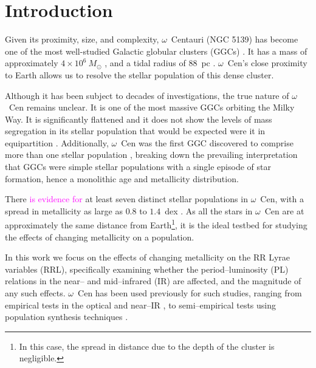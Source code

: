 \documentclass[a4paper,fleqn,usenatbib]{mnras}
\newcommand{\ocen}{$\omega$~Cen\xspace}
\begin{document}
\section{Introduction}
\label{sec:intro}

Given its proximity, size, and complexity, $\omega$~Centauri (NGC 5139) has become one of the most well-studied Galactic globular clusters (GGCs) \citep{2002ASPC..265.....V}. It has a mass of approximately $4 \times 10^6~M_{\odot}$ \citep{2013MNRAS.429.1887D}, and a tidal radius of 88~pc \citep{2005MNRAS.360..631M}. \ocen's close proximity to Earth \citep[$d \sim 5.5$~kpc, e.g.][]{2006ApJ...652..362D, 2001AJ....121.3089T} allows us to resolve the stellar population of this dense cluster. 

Although it has been subject to decades of investigations, the true nature of \ocen remains unclear. It is one of the most massive GGCs orbiting the Milky Way. It is significantly flattened \citep[$\epsilon = 1 - b/a = 0.17$][]{2005MNRAS.360..631M} and it does not show the levels of mass segregation in its stellar population that would be expected were it in equipartition \citep{2002ASPC..265...87A}. Additionally, \ocen was the first GGC discovered to comprise more than one stellar population \citep{1999Natur.402...55L}, breaking down the prevailing interpretation that GGCs were simple stellar populations with a single episode of star formation, hence a monolithic age and metallicity distribution.

There \textcolor{magenta}{is evidence for} at least seven distinct stellar populations in \ocen \citep{2016MNRAS.457.4525T}, with a spread in metallicity as large as $0.8$ to $1.4$~dex \citep{2014ApJ...791..107V, 2012ApJ...746...14M, 2010ApJ...722.1373J}. As all the stars in \ocen are at approximately the same distance from Earth\footnote{In this case, the spread in distance due to the depth of the cluster is negligible.}, it is the ideal testbed for studying the effects of changing metallicity on a population.

In this work we focus on the effects of changing metallicity on the RR Lyrae variables (RRL), specifically examining whether the period--luminosity (PL) relations in the near-- and mid--infrared (IR) are affected, and the magnitude of any such effects. \ocen has been used previously for such studies, ranging from empirical tests in the optical \citep[e.g.][]{2003MNRAS.345...86O, 1991ApJ...373L..43L} and near--IR \citep[e.g.][]{2006MmSAI..77..245C, 2006ApJ...652..362D}, to semi--empirical tests using population synthesis techniques \citep{2016MNRAS.457.4525T}. 
\end{document}
